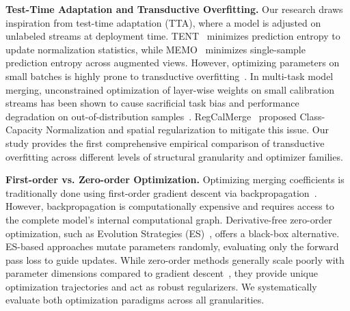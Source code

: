 \textbf{Test-Time Adaptation and Transductive Overfitting.} 
Our research draws inspiration from test-time adaptation (TTA), where a model is adjusted on unlabeled streams at deployment time. 
TENT~\cite{wang2020tent} minimizes prediction entropy to update normalization statistics, while MEMO~\cite{zhang2021memo} minimizes single-sample prediction entropy across augmented views. 
However, optimizing parameters on small batches is highly prone to transductive overfitting~\cite{mueller2023analyzing,goyal2022test}. 
In multi-task model merging, unconstrained optimization of layer-wise weights on small calibration streams has been shown to cause sacrificial task bias and performance degradation on out-of-distribution samples~\cite{jin2026regcal}. 
RegCalMerge~\cite{jin2026regcal} proposed Class-Capacity Normalization and spatial regularization to mitigate this issue. 
Our study provides the first comprehensive empirical comparison of transductive overfitting across different levels of structural granularity and optimizer families.

\textbf{First-order vs. Zero-order Optimization.} 
Optimizing merging coefficients is traditionally done using first-order gradient descent via backpropagation~\cite{yang2024adamerging,kingma2014adam}. 
However, backpropagation is computationally expensive and requires access to the complete model's internal computational graph. 
Derivative-free zero-order optimization, such as Evolution Strategies (ES)~\cite{rechenberg1973evolutionsstrategie,salimans2017evolution}, offers a black-box alternative. 
ES-based approaches mutate parameters randomly, evaluating only the forward pass loss to guide updates. 
While zero-order methods generally scale poorly with parameter dimensions compared to gradient descent~\cite{hansen2001completely}, they provide unique optimization trajectories and act as robust regularizers. 
We systematically evaluate both optimization paradigms across all granularities.
